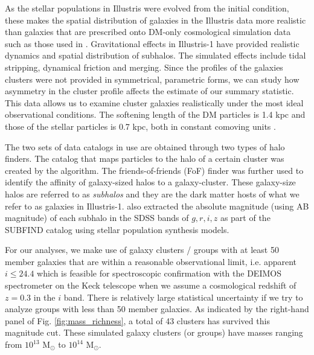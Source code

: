 As the stellar populations in Illustris were evolved from the initial condition,
these makes the spatial distribution of galaxies in the Illustris data more 
realistic than galaxies that are prescribed onto DM-only cosmological
simulation data such as those used in \cite{Harvey2013d}.  
Gravitational effects in Illustris-1 have provided realistic dynamics and
spatial distribution of subhalos. The simulated effects include
tidal stripping, dynamical friction and merging. 
Since the profiles of the galaxies clusters were not
provided in symmetrical, parametric forms, we can study 
how asymmetry in the cluster profile affects the estimate of our summary 
statistic. This data allows us to examine cluster galaxies
realistically under the most ideal observational conditions. 
The softening length of the DM particles is
1.4 kpc and those of the stellar particles is 
0.7 kpc, both in constant comoving units \citep{Genel2014a}.

The two sets of data catalogs in use are obtained through two types of halo
finders. The catalog that maps particles to the halo of a certain cluster was 
created by the {} algorithm. The friends-of-friends (FoF) 
finder \citep{Davis1985} was further used to identify the affinity
of galaxy-sized halos to a galaxy-cluster. 
These galaxy-size halos are referred to as {\it subhalos} and 
they are the dark matter hosts of what we refer to as galaxies in Illustris-1. 
\cite{Vogelsberger2014a} also extracted the 
absolute magnitude (using AB magnitude) of each subhalo in
the SDSS bands of $g, r, i, z$ as part of the {\sc
SUBFIND} catalog using stellar population synthesis models.

For our analyses, we make use of galaxy clusters / groups 
with at least 50 member galaxies that are within a reasonable observational limit, 
i.e. apparent $i \leq 24.4$ which is feasible for spectroscopic confirmation with the DEIMOS
spectrometer on the Keck telescope when we assume a cosmological redshift of $z = 0.3$
in the $i$ band. %
There is relatively large statistical uncertainty if we try
to analyze groups with less than 50 member galaxies. 
As indicated by the right-hand panel of Fig. \ref{fig:mass_richness}, 
a total of 43 clusters has 
survived this magnitude cut. These simulated galaxy clusters (or groups) have 
masses ranging from $10^{13}$ M$_\odot $ to $10^{14}$ M$_\odot$.  

